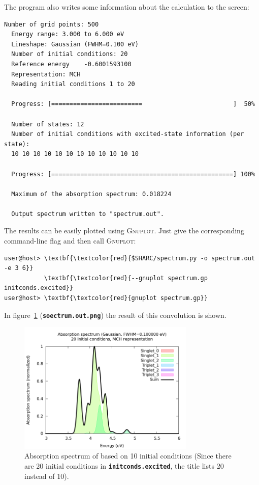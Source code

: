 \documentclass[a4paper,11pt,DIV=15,openany]{scrbook}
\newcommand{\ttt}[1]{\textbf{\texttt{#1}}}
\begin{document}
The program also writes some information about the calculation to the screen:
\begin{oframed}
\footnotesize\begin{Verbatim}[commandchars=\\\{\}]
  Number of grid points: 500
  Energy range: 3.000 to 6.000 eV
  Lineshape: Gaussian (FWHM=0.100 eV)
  Number of initial conditions: 20
  Reference energy    -0.6001593100
  Representation: MCH
  Reading initial conditions 1 to 20
  
  Progress: [=========================                         ]  50%
  
  Number of states: 12
  Number of initial conditions with excited-state information (per state):
  10 10 10 10 10 10 10 10 10 10 10 10 
  
  Progress: [==================================================] 100%
  
  Maximum of the absorption spectrum: 0.018224
  
  Output spectrum written to "spectrum.out".
\end{Verbatim}
\end{oframed}

\normalsize
The results can be easily plotted using \textsc{Gnuplot}. Just give the corresponding command-line flag and then call \textsc{Gnuplot}:
\begin{Verbatim}[commandchars=\\\{\}]
user@host> \textbf{\textcolor{red}{$SHARC/spectrum.py -o spectrum.out -e 3 6}}
           \textbf{\textcolor{red}{--gnuplot spectrum.gp initconds.excited}}
user@host> \textbf{\textcolor{red}{gnuplot spectrum.gp}}
\end{Verbatim}

In figure~\ref{fig:spectrum} (\ttt{soectrum.out.png}) the result of this convolution is shown.

\begin{figure}[h]
  \centering
  \includegraphics[width=0.75\textwidth]{figures/spectrum.png}
  \caption{Absorption spectrum of  based on 10 initial conditions (Since there are 20 initial conditions in \ttt{initconds.excited}, the title lists 20 instead of 10).}
  \label{fig:spectrum}
\end{figure}
\end{document}
